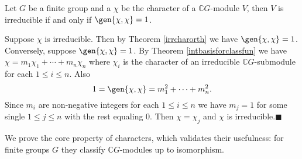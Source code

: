\documentclass[../Project.tex]{subfiles}
\begin{document}
\begin{theo}[{\cite[Theorem 14.20]{2}}]
	\label{irreifinnerprod1}
	Let $G$ be a finite group and a $\chi$ be the character of a  $\mathbb{C}G$-module $V$, then $V$ is irreducible if and only if $\gen{\chi,\chi} = 1$.
\end{theo}
\begin{proo*}[{\cite[Theorem 14.20]{2}}]
	Suppose $\chi$ is irreducible. Then by Theorem 	\ref{irrcharorth} we have $\gen{\chi,\chi} = 1$.\\

	Conversely, suppose $\gen{\chi,\chi} = 1$.
	By Theorem \ref{intbasisforclassfun} we have $\chi = m_1\chi_1 + \cdots + m_n\chi_n$ where $\chi_i$ is the character of an irreducible $\mathbb{C}G$-submodule for each $1 \leqslant i \leqslant n$. Also
	$$1 = \gen{\chi,\chi} = m_1^2 + \cdots + m_n^2.$$
	Since $m_i$ are non-negative integers for each $1 \leqslant i \leqslant n$ we have $m_j = 1$ for some single $1 \leqslant j \leqslant n$ with the rest equaling 0. Then $\chi = \chi_j$ and $\chi$ is irreducible.\hfill$\blacksquare$
\end{proo*}

We prove the core property of characters, which validates their usefulness: for finite groups $G$ they classify $\mathbb{C}G$-modules up to isomorphism.
\end{document}
